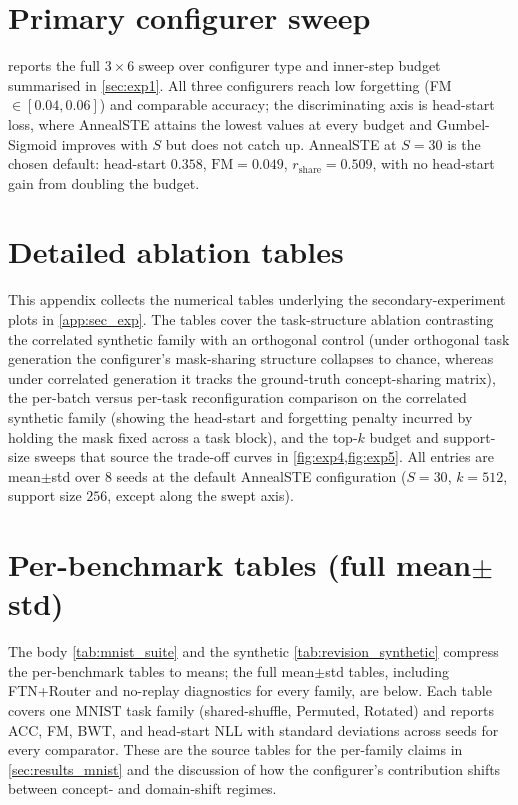 \documentclass[11pt]{article}
\begin{document}
\section{Primary configurer sweep}\label{app:primary_sweep}
 reports the full $3\times 6$ sweep over configurer type and inner-step budget summarised in \cref{sec:exp1}. All three configurers reach low forgetting (FM\,$\in [0.04, 0.06]$) and comparable accuracy; the discriminating axis is head-start loss, where AnnealSTE attains the lowest values at every budget and Gumbel-Sigmoid improves with $S$ but does not catch up. AnnealSTE at $S=30$ is the chosen default: head-start $0.358$, $\mathrm{FM}=0.049$, $r_{\mathrm{share}}=0.509$, with no head-start gain from doubling the budget.


\section{Detailed ablation tables}\label{app:ablation_tables}
This appendix collects the numerical tables underlying the secondary-experiment plots in \cref{app:sec_exp}. The tables cover the task-structure ablation contrasting the correlated synthetic family with an orthogonal control (under orthogonal task generation the configurer's mask-sharing structure collapses to chance, whereas under correlated generation it tracks the ground-truth concept-sharing matrix), the per-batch versus per-task reconfiguration comparison on the correlated synthetic family (showing the head-start and forgetting penalty incurred by holding the mask fixed across a task block), and the top-$k$ budget and support-size sweeps that source the trade-off curves in \cref{fig:exp4,fig:exp5}. All entries are mean$\pm$std over 8 seeds at the default AnnealSTE configuration ($S{=}30$, $k{=}512$, support size $256$, except along the swept axis).

\section{Per-benchmark tables (full mean$\pm$std)}\label{app:revision_tables}
The body \cref{tab:mnist_suite} and the synthetic \cref{tab:revision_synthetic} compress the per-benchmark tables to means; the full mean$\pm$std tables, including FTN+Router and no-replay diagnostics for every family, are below. Each table covers one MNIST task family (shared-shuffle, Permuted, Rotated) and reports ACC, FM, BWT, and head-start NLL with standard deviations across seeds for every comparator. These are the source tables for the per-family claims in \cref{sec:results_mnist} and the discussion of how the configurer's contribution shifts between concept- and domain-shift regimes.



\end{document}
